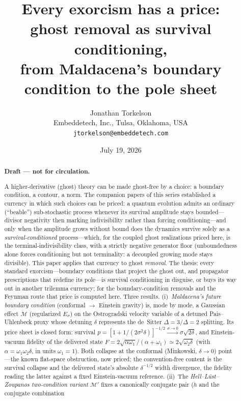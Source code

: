 \documentclass[11pt]{article}
\title{Every exorcism has a price:\\
ghost removal as survival conditioning,\\
from Maldacena's boundary condition to the pole sheet}
\author{Jonathan Torkelson\\[2pt]
\small Embeddetech, Inc., Tulsa, Oklahoma, USA\\
\small\texttt{jtorkelson@embeddetech.com}}
\date{July 19, 2026}
\theoremstyle{definition}
\theoremstyle{remark}
\begin{document}
\maketitle

\begin{abstract}
\noindent\textbf{Draft --- not for circulation.}\medskip

\noindent
A higher-derivative (ghost) theory can be made ghost-free by a
choice: a boundary condition, a contour, a norm. The companion papers
of this series established a currency in which such choices can be
priced: a quantum evolution admits an ordinary
(``beable'') sub-stochastic process whenever its survival amplitude
stays bounded---divisor negativity then marking indivisibility rather
than forcing conditioning---and only when the amplitude grows without
bound does the dynamics survive solely as a \emph{survival-conditioned}
process---which, for the coupled ghost realizations priced here, is the
terminal-indivisibility class, with a strictly negative generator
floor (unboundedness alone forces conditioning but not terminality: a
decoupled growing mode stays divisible). This paper applies that currency to ghost \emph{removal}. The
thesis: every standard exorcism---boundary conditions that project the
ghost out, and propagator prescriptions that redefine its pole---is
survival conditioning in disguise, or buys its way out in another
trilemma currency; for the boundary-condition removals and the
Feynman route that price is computed here.
Three results. (i)~\emph{Maldacena's future boundary condition}
(conformal $\to$ Einstein gravity) is, mode by mode, a Gaussian effect
$\mathcal{M}$ (regularized $E_{\sigma}$) on the Ostrogradski velocity variable of a detuned
Pais--Uhlenbeck proxy whose detuning $\delta$ represents the de~Sitter
$\Delta=3/\Delta=2$ splitting. Its price sheet is closed form:
survival $p=[1+1/(2\sigma^{2}\delta)]^{-1/2}\xrightarrow{\sigma\to0}\sigma\sqrt{2\delta}$,
and Einstein-vacuum fidelity of the delivered state
$F=2\sqrt{\alpha\omega_{1}}/(\alpha+\omega_{1})\simeq2\sqrt{\omega_{2}\delta}$ (with
$\alpha=\omega_{1}\omega_{2}\delta$, in units $\omega_{1}=1$).
Both collapse at the conformal (Minkowski, $\delta\to0$) point---the
known flat-space obstruction, now priced; the convention-free content
is the survival collapse and the delivered state's absolute
$\delta^{-1/2}$ width divergence, the fidelity reading the latter
against a fixed Einstein-vacuum reference. (ii)~The
\emph{Hell--L\"ust--Zoupanos two-condition variant} $\mathcal{M}'$ fixes a
canonically conjugate pair ($\dot h$ and the conjugate combination

\end{abstract}
\end{document}
